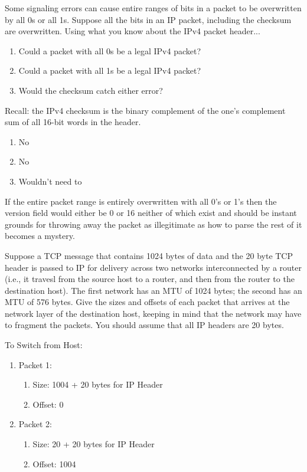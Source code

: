 \documentclass[12pt,addpoints,answers]{exam}
\begin{document}
\begin{questions}
\question[4] Some signaling errors can cause entire ranges of bits in a packet to be overwritten by all 0s or all 1s. Suppose all the bits in an IP packet, including the checksum are overwritten. Using what you know about the IPv4 packet header...
\begin{enumerate}
\item Could a packet with all 0s be a legal IPv4 packet?
\item Could a packet with all 1s be a legal IPv4 packet?
\item Would the checksum catch either error?
\end{enumerate}
Recall: the IPv4 checksum is the binary complement of the one's complement sum of all 16-bit words in the header.
\begin{solution}
	\begin{enumerate}
		\item No
		\item No
		\item Wouldn't need to
	\end{enumerate}
	
	If the entire packet range is entirely overwritten with all 0's or 1's then the version field would either be 0 or 16 neither of which exist and should be instant grounds for throwing away the packet as illegitimate as how to parse the rest of it becomes a mystery.  
\end{solution}

\question[8] Suppose a TCP message that contains 1024 bytes of data and the 20 byte TCP header is passed to IP for delivery across two networks interconnected by a router (i.e., it travesl from the source host to a router, and then from the router to the destination host). The first network has an MTU of 1024 bytes; the second has an MTU of 576 bytes. Give the sizes and offsets of each packet that arrives at the network layer of the destination host, keeping in mind that the network may have to fragment the packets. You should assume that all IP headers are 20 bytes.
\begin{solution}
	To Switch from Host:
	\begin{enumerate}		
		\item Packet 1: 
		\begin{enumerate}
			\item Size: 1004 + 20 bytes for IP Header
			\item Offset: 0
		\end{enumerate}
			\item Packet 2: 
		\begin{enumerate}
			\item Size: 20 + 20 bytes for IP Header
			\item Offset: 1004
		\end{enumerate}
	\end{enumerate}


\end{solution}
\end{questions}
\end{document}
